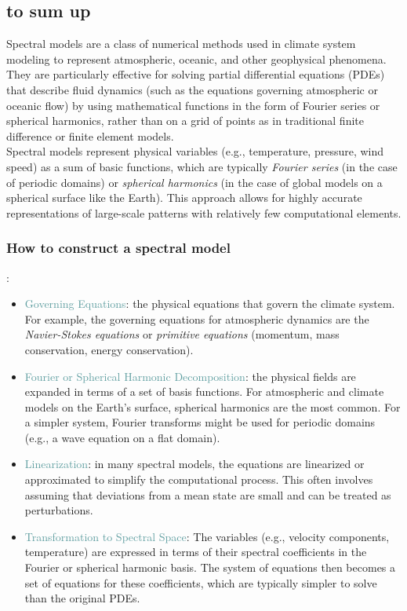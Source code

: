 \subsection{to sum up}
Spectral models are a class of numerical methods used in climate system modeling to represent atmospheric, oceanic, and other geophysical phenomena. They are particularly effective for solving partial differential equations (PDEs) that describe fluid dynamics (such as the equations governing atmospheric or oceanic flow) by using mathematical functions in the form of Fourier series or spherical harmonics, rather than on a grid of points as in traditional finite difference or finite element models. \\

Spectral models represent physical variables (e.g., temperature, pressure, wind speed) as a sum of basic functions, which are typically \textit{Fourier series} (in the case of periodic domains) or \textit{spherical harmonics} (in the case of global models on a spherical surface like the Earth). This approach allows for highly accurate representations of large-scale patterns with relatively few computational elements.

\subsubsection{How to construct a spectral model}:
\begin{itemize}
	\item \textcolor{CadetBlue}{Governing Equations}: the physical equations that govern the climate system. For example, the governing equations for atmospheric dynamics are the \textit{Navier-Stokes equations} or \textit{primitive equations} (momentum, mass conservation, energy conservation).
	\item \textcolor{CadetBlue}{Fourier or Spherical Harmonic Decomposition}: the physical fields are expanded in terms of a set of basis functions. For atmospheric and climate models on the Earth's surface, spherical harmonics are the most common. For a simpler system, Fourier transforms might be used for periodic domains (e.g., a wave equation on a flat domain).
	\item \textcolor{CadetBlue}{Linearization}: in many spectral models, the equations are linearized or approximated to simplify the computational process. This often involves assuming that deviations from a mean state are small and can be treated as perturbations.
	\item \textcolor{CadetBlue}{Transformation to Spectral Space}: The variables (e.g., velocity components, temperature) are expressed in terms of their spectral coefficients in the Fourier or spherical harmonic basis. The system of equations then becomes a set of equations for these coefficients, which are typically simpler to solve than the original PDEs.
\end{itemize}

